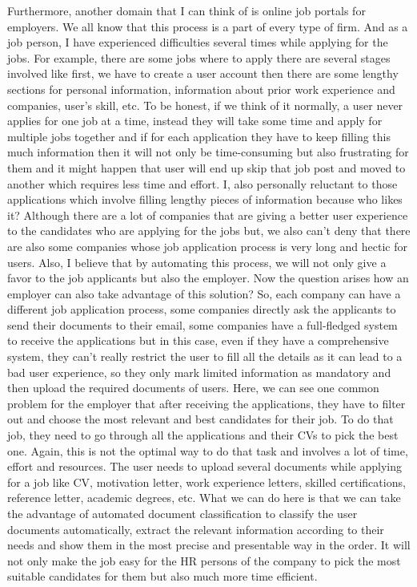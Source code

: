 \newline
\par
Furthermore, another domain that I can think of is online job portals for employers. We all know that this process is a part of every type of firm. And as a job person, I have experienced difficulties several times while applying for the jobs. For example, there are some jobs where to apply there are several stages involved like first, we have to create a user account then there are some lengthy sections for personal information, information about prior work experience and companies, user's skill, etc. To be honest, if we think of it normally, a user never applies for one job at a time, instead they will take some time and apply for multiple jobs together and if for each application they have to keep filling this much information then it will not only be time-consuming but also frustrating for them and it might happen that user will end up skip that job post and moved to another which requires less time and effort. I, also personally reluctant to those applications which involve filling lengthy pieces of information because who likes it? Although there are a lot of companies that are giving a better user experience to the candidates who are applying for the jobs but, we also can't deny that there are also some companies whose job application process is very long and hectic for users. Also, I believe that by automating this process, we will not only give a favor to the job applicants but also the employer. Now the question arises how an employer can also take advantage of this solution? So, each company can have a different job application process, some companies directly ask the applicants to send their documents to their email, some companies have a full-fledged system to receive the applications but in this case, even if they have a comprehensive system, they can't really restrict the user to fill all the details as it can lead to a bad user experience, so they only mark limited information as mandatory and then upload the required documents of users. Here, we can see one common problem for the employer that after receiving the applications, they have to filter out and choose the most relevant and best candidates for their job. To do that job, they need to go through all the applications and their CVs to pick the best one. Again, this is not the optimal way to do that task and involves a lot of time, effort and resources. The user needs to upload several documents while applying for a job like CV, motivation letter, work experience letters, skilled certifications, reference letter, academic degrees, etc. What we can do here is that we can take the advantage of automated document classification to classify the user documents automatically, extract the relevant information according to their needs and show them in the most precise and presentable way in the order. It will not only make the job easy for the HR persons of the company to pick the most suitable candidates for them but also much more time efficient. 
